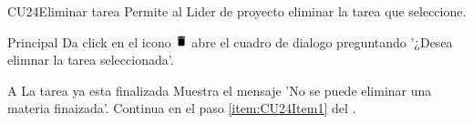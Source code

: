 \begin{UseCase}{CU24}{Eliminar tarea}{
		Permite al Lider de proyecto eliminar la tarea que seleccione.
	}
	\end{UseCase}
	\begin{UCtrayectoria}{Principal}
		\UCpaso[\UCactor] Da click en el icono \includegraphics[height=10pt]{./images/iconos/ic_delete_black_18dp.png}
        \UCpaso [\UCsist] abre el cuadro de dialogo preguntando '¿Desea elimnar la tarea seleccionada'.  \label{item:CU24Item1}
	\end{UCtrayectoria}
\begin{UCtrayectoriaA}{A}{ La tarea ya esta finalizada}
			\UCpaso [\UCsist] Muestra el mensaje 'No se puede eliminar una materia finaizada'.
			\UCpaso [\UCsist] Continua en el paso \ref{item:CU24Item1} del .
		\end{UCtrayectoriaA}		
		
